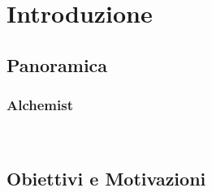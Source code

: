 \chapter{Introduzione}\label{chap:introduction}

\section{Panoramica}\label{sec:background}
\subsection{Alchemist}\label{ssec:alchemist}
~\cite{alchemist}
\section{Obiettivi e Motivazioni}\label{sec:objectives}

